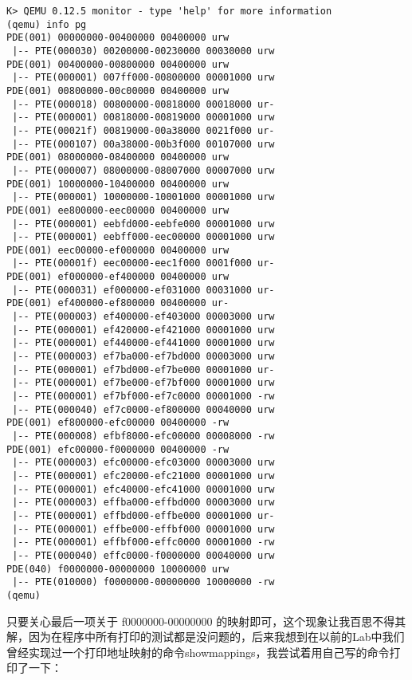 \documentclass{article}
\begin{document}
\begin{CJK*}{UTF8}{gkai}
\begin{lstlisting}[style=console]
K> QEMU 0.12.5 monitor - type 'help' for more information
(qemu) info pg
PDE(001) 00000000-00400000 00400000 urw
 |-- PTE(000030) 00200000-00230000 00030000 urw
PDE(001) 00400000-00800000 00400000 urw
 |-- PTE(000001) 007ff000-00800000 00001000 urw
PDE(001) 00800000-00c00000 00400000 urw
 |-- PTE(000018) 00800000-00818000 00018000 ur-
 |-- PTE(000001) 00818000-00819000 00001000 urw
 |-- PTE(00021f) 00819000-00a38000 0021f000 ur-
 |-- PTE(000107) 00a38000-00b3f000 00107000 urw
PDE(001) 08000000-08400000 00400000 urw
 |-- PTE(000007) 08000000-08007000 00007000 urw
PDE(001) 10000000-10400000 00400000 urw
 |-- PTE(000001) 10000000-10001000 00001000 urw
PDE(001) ee800000-eec00000 00400000 urw
 |-- PTE(000001) eebfd000-eebfe000 00001000 urw
 |-- PTE(000001) eebff000-eec00000 00001000 urw
PDE(001) eec00000-ef000000 00400000 urw
 |-- PTE(00001f) eec00000-eec1f000 0001f000 ur-
PDE(001) ef000000-ef400000 00400000 urw
 |-- PTE(000031) ef000000-ef031000 00031000 ur-
PDE(001) ef400000-ef800000 00400000 ur-
 |-- PTE(000003) ef400000-ef403000 00003000 urw
 |-- PTE(000001) ef420000-ef421000 00001000 urw
 |-- PTE(000001) ef440000-ef441000 00001000 urw
 |-- PTE(000003) ef7ba000-ef7bd000 00003000 urw
 |-- PTE(000001) ef7bd000-ef7be000 00001000 ur-
 |-- PTE(000001) ef7be000-ef7bf000 00001000 urw
 |-- PTE(000001) ef7bf000-ef7c0000 00001000 -rw
 |-- PTE(000040) ef7c0000-ef800000 00040000 urw
PDE(001) ef800000-efc00000 00400000 -rw
 |-- PTE(000008) efbf8000-efc00000 00008000 -rw
PDE(001) efc00000-f0000000 00400000 -rw
 |-- PTE(000003) efc00000-efc03000 00003000 urw
 |-- PTE(000001) efc20000-efc21000 00001000 urw
 |-- PTE(000001) efc40000-efc41000 00001000 urw
 |-- PTE(000003) effba000-effbd000 00003000 urw
 |-- PTE(000001) effbd000-effbe000 00001000 ur-
 |-- PTE(000001) effbe000-effbf000 00001000 urw
 |-- PTE(000001) effbf000-effc0000 00001000 -rw
 |-- PTE(000040) effc0000-f0000000 00040000 urw
PDE(040) f0000000-00000000 10000000 urw
 |-- PTE(010000) f0000000-00000000 10000000 -rw
(qemu) 
\end{lstlisting}

只要关心最后一项关于 f0000000-00000000 的映射即可，这个现象让我百思不得其解，因为在程序中所有打印的测试都是没问题的，后来我想到在以前的Lab中我们曾经实现过一个打印地址映射的命令showmappings，我尝试着用自己写的命令打印了一下：

\newpage


\end{CJK*}
\end{document}
